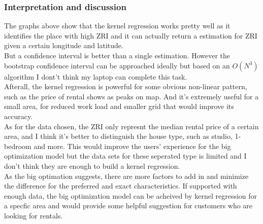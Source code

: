 \documentclass[a4paper]{article}
\begin{document}
\subsubsection{Interpretation and discussion}
The graphs above show that the kernel regression works pretty well as it identifies the place with high ZRI and it can actually return a estimation for ZRI given a certain longitude and latitude.\\
But a confidence interval is better than a single estimation. However the bootstrap confidence interval can be approached ideally but based on an $O(N^3)$ algorithm I dont't think my laptop can complete this task.\\
Afterall, the kernel regression is powerful for some obvious non-linear pattern, such as the price of rental shows as peaks on map. And it's extremely useful for a small area, for reduced work load and smaller grid that would improve its accuracy.\\
As for the data chosen, the ZRI only represnt the median rental price of a certain area, and I think it's better to distinguish the house type, such as studio, 1-bedroom and more. This would improve the users' experience for the big optimization model but the data sets for these seperated type is limited and I don't think they are enough to build a kernel regression.\\
As the big optimation suggests, there are more factors to add in and minimize the difference for the preferred and exact characteristics. If supported with enough data, the big optimization model can be acheived by kernel regression for a specfic area and would provide some helpful suggestion for customers who are looking for rentals.
\end{document}
